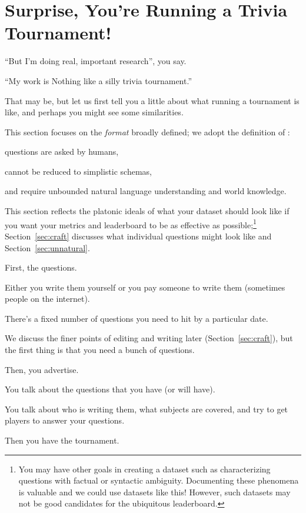 

\section{Surprise, You're Running a Trivia Tournament!}
\label{sec:tournament}



``But I'm doing real, important research'', you say.  

``My work is Nothing like a silly trivia tournament.''  

That may be, but let us first tell you a little about what running a tournament is like, and perhaps you might see some similarities.

This section focuses on the  \emph{format} broadly defined; we adopt the definition of :

questions are asked by humans,

cannot be reduced to simplistic schemas,

and require unbounded natural language understanding and world knowledge. 

This section reflects the platonic ideals of what your dataset should look like if you want your metrics and leaderboard to be as effective as possible;\footnote{You may have other goals in creating a  dataset such as characterizing questions with factual or syntactic ambiguity.  Documenting these phenomena is valuable and we could use datasets like this!  However, such datasets may not be good candidates for the ubiquitous leaderboard.} Section~\ref{sec:craft} discusses what individual questions might look like and Section~\ref{sec:unnatural}.

First, the questions.

Either you write them yourself or you pay someone to write them (sometimes people on the internet). 

There's a fixed number of questions you need to hit by a particular date. 

We discuss the finer points of editing and writing later (Section~\ref{sec:craft}), but the first thing is that you need a bunch of questions.

Then, you advertise.  

You talk about the questions that you have (or will have).  

You talk about who is writing them, what subjects are covered, and try to get players to answer your questions.

Then you have the tournament. 

